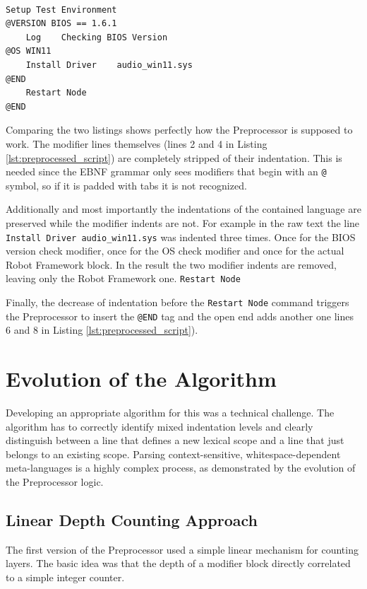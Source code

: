 \begin{lstlisting}[caption={Expected Preprocesssor output}, label={lst:preprocessed_script}]

Setup Test Environment
@VERSION BIOS == 1.6.1
    Log    Checking BIOS Version
@OS WIN11
    Install Driver    audio_win11.sys
@END
    Restart Node
@END

\end{lstlisting}


Comparing the two listings shows perfectly how the Preprocessor is supposed to work. The modifier lines themselves (lines 2 and 4 in Listing \ref{lst:preprocessed_script}) are completely stripped of their indentation. This is needed since the EBNF grammar only sees modifiers that begin with an \texttt{@} symbol, so if it is padded with tabs it is not recognized.

Additionally and most importantly the indentations of the contained language are preserved while the modifier indents are not. For example in the raw text the line \texttt{Install Driver    audio\_win11.sys} was indented three times. Once for the BIOS version check modifier, once for the OS check modifier and once for the actual Robot Framework block. In the result the two modifier indents are removed, leaving only the Robot Framework one.
\texttt{Restart Node}

Finally, the decrease of indentation before the \texttt{Restart Node} command triggers the Preprocessor to insert the \texttt{@END} tag and the open end adds another one lines 6 and 8 in Listing \ref{lst:preprocessed_script}).


\section{Evolution of the Algorithm}


Developing an appropriate algorithm for this was a technical challenge. The algorithm has to correctly identify mixed indentation levels and clearly distinguish between a line that defines a new lexical scope and a line that just belongs to an existing scope. Parsing context-sensitive, whitespace-dependent meta-languages is a highly complex process, as demonstrated by the evolution of the Preprocessor logic.


\subsection{Linear Depth Counting Approach}


The first version of the Preprocessor used a simple linear mechanism for counting layers. The basic idea was that the depth of a modifier block directly correlated to a simple integer counter. 


